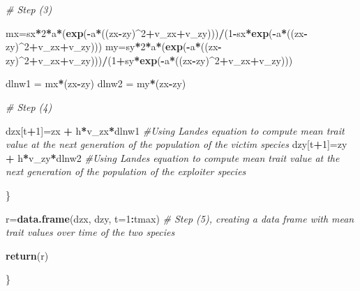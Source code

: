 \documentclass[
]{book}
\newenvironment{Shaded}{\begin{snugshade}}{\end{snugshade}}
\newcommand{\AttributeTok}[1]{\textcolor[rgb]{0.13,0.29,0.53}{#1}}
\newcommand{\CommentTok}[1]{\textcolor[rgb]{0.56,0.35,0.01}{\textit{#1}}}
\newcommand{\DecValTok}[1]{\textcolor[rgb]{0.00,0.00,0.81}{#1}}
\newcommand{\FunctionTok}[1]{\textcolor[rgb]{0.13,0.29,0.53}{\textbf{#1}}}
\newcommand{\NormalTok}[1]{#1}
\newcommand{\OtherTok}[1]{\textcolor[rgb]{0.56,0.35,0.01}{#1}}
\newcommand{\SpecialCharTok}[1]{\textcolor[rgb]{0.81,0.36,0.00}{\textbf{#1}}}
\begin{document}
\begin{Shaded}
\begin{Highlighting}[]
    \CommentTok{\# Step (3)}
    
\NormalTok{    mx}\OtherTok{=}\NormalTok{sx}\SpecialCharTok{*}\DecValTok{2}\SpecialCharTok{*}\NormalTok{a}\SpecialCharTok{*}\NormalTok{(}\FunctionTok{exp}\NormalTok{(}\SpecialCharTok{{-}}\NormalTok{a}\SpecialCharTok{*}\NormalTok{((zx}\SpecialCharTok{{-}}\NormalTok{zy)}\SpecialCharTok{\^{}}\DecValTok{2}\SpecialCharTok{+}\NormalTok{v\_zx}\SpecialCharTok{+}\NormalTok{v\_zy)))}\SpecialCharTok{/}\NormalTok{(}\DecValTok{1}\SpecialCharTok{{-}}\NormalTok{sx}\SpecialCharTok{*}\FunctionTok{exp}\NormalTok{(}\SpecialCharTok{{-}}\NormalTok{a}\SpecialCharTok{*}\NormalTok{((zx}\SpecialCharTok{{-}}\NormalTok{zy)}\SpecialCharTok{\^{}}\DecValTok{2}\SpecialCharTok{+}\NormalTok{v\_zx}\SpecialCharTok{+}\NormalTok{v\_zy)))}
\NormalTok{    my}\OtherTok{=}\NormalTok{sy}\SpecialCharTok{*}\DecValTok{2}\SpecialCharTok{*}\NormalTok{a}\SpecialCharTok{*}\NormalTok{(}\FunctionTok{exp}\NormalTok{(}\SpecialCharTok{{-}}\NormalTok{a}\SpecialCharTok{*}\NormalTok{((zx}\SpecialCharTok{{-}}\NormalTok{zy)}\SpecialCharTok{\^{}}\DecValTok{2}\SpecialCharTok{+}\NormalTok{v\_zx}\SpecialCharTok{+}\NormalTok{v\_zy)))}\SpecialCharTok{/}\NormalTok{(}\DecValTok{1}\SpecialCharTok{+}\NormalTok{sy}\SpecialCharTok{*}\FunctionTok{exp}\NormalTok{(}\SpecialCharTok{{-}}\NormalTok{a}\SpecialCharTok{*}\NormalTok{((zx}\SpecialCharTok{{-}}\NormalTok{zy)}\SpecialCharTok{\^{}}\DecValTok{2}\SpecialCharTok{+}\NormalTok{v\_zx}\SpecialCharTok{+}\NormalTok{v\_zy)))}
    
\NormalTok{    dlnw1 }\OtherTok{=}\NormalTok{ mx}\SpecialCharTok{*}\NormalTok{(zx}\SpecialCharTok{{-}}\NormalTok{zy)}
\NormalTok{    dlnw2 }\OtherTok{=}\NormalTok{ my}\SpecialCharTok{*}\NormalTok{(zx}\SpecialCharTok{{-}}\NormalTok{zy)}
    
    \CommentTok{\# Step (4)}
    
\NormalTok{    dzx[t}\SpecialCharTok{+}\DecValTok{1}\NormalTok{]}\OtherTok{=}\NormalTok{zx }\SpecialCharTok{+}\NormalTok{ h}\SpecialCharTok{*}\NormalTok{v\_zx}\SpecialCharTok{*}\NormalTok{dlnw1 }\CommentTok{\#Using Lande\textquotesingle{}s equation to compute mean trait value at the next generation of the population of the victim species}
\NormalTok{    dzy[t}\SpecialCharTok{+}\DecValTok{1}\NormalTok{]}\OtherTok{=}\NormalTok{zy }\SpecialCharTok{+}\NormalTok{ h}\SpecialCharTok{*}\NormalTok{v\_zy}\SpecialCharTok{*}\NormalTok{dlnw2 }\CommentTok{\#Using Lande\textquotesingle{}s equation to compute mean trait value at the next generation of the population of the exploiter species}
    
\NormalTok{  \}}
  
\NormalTok{  r}\OtherTok{=}\FunctionTok{data.frame}\NormalTok{(dzx, dzy, }\AttributeTok{t=}\DecValTok{1}\SpecialCharTok{:}\NormalTok{tmax) }\CommentTok{\# Step (5), creating a data frame with mean trait values over time of the two species}
  
  \FunctionTok{return}\NormalTok{(r)}
  
\NormalTok{\}}
\end{Highlighting}
\end{Shaded}
\end{document}
